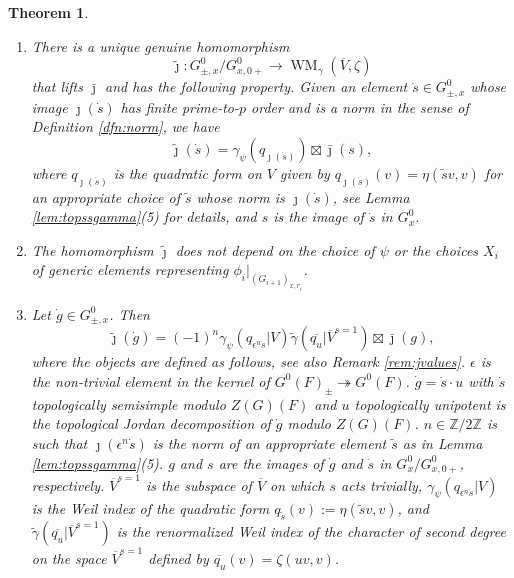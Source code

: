 \documentclass{article}
\def\ol#1{\overline{#1}}
\newcommand{\bZ}{\mathbb{Z}}
\newcommand{\eps}{\epsilon}
\newtheorem{thm}{Theorem}[subsection]
\theoremstyle{definition}
\numberwithin{equation}{subsection}
\renewcommand{\-}{\hyp{}}
\DeclareMathOperator{\WM}{WM}
\begin{document}
\begin{thm}\label{thm:main1b}
	 \leavevmode \begin{enumerate}
		\item \label{item:existenceoftildej} There is a unique genuine homomorphism
		\[ \tilde \jmath : G^0_{\pm, x}/G^0_{x,0+} \to \WM_\gamma(\ol{V}, \zeta) \]
		that lifts $\bar\jmath$ and has the following property. Given an element $\dot s \in G^0_{\pm,x}$ whose image $\jmath(\dot s)$ has finite prime-to-$p$ order and is a norm in the sense of Definition \ref{dfn:norm}, we have \[ \tilde\jmath(\dot s) = \gamma_\psi(q_{\jmath(\dot s)}) \boxtimes \bar\jmath(s), \]
		 where $q_{\jmath(\dot s)}$ is the quadratic form on $V$ given by $q_{\jmath(\dot s)}(v)=\eta(\tilde s v, v)$ for an appropriate choice of $\tilde s$ whose norm is $\jmath(\dot s)$, see Lemma \ref{lem:topssgamma}(5) for details, and $s$ is the image of $\dot s$ in $G_{x}^0$.
		
		\item\label{item:independenceofXi} The homomorphism $\tilde \jmath$ does not depend on the choice of $\psi$ or the choices $X_i$ of generic elements representing $\phi_i|_{(G_{i+1})_{x,r_i}}$.
		
		\item \label{item:description} Let $\dot g \in G^0_{\pm, x}$. Then 
			\begin{equation}
			\tilde\jmath(\dot g)=(-1)^n\gamma_\psi(q_{\epsilon^n\dot s}|V)\tilde\gamma(\overline{q_u}|\ol{V}^{s=1}) \boxtimes \bar\jmath(g),
		\end{equation}
		where the objects are defined as follows, see also Remark \ref{rem:jvalues}. $\epsilon$ is the non-trivial element in the kernel of $G^0(F)_{\pm} \twoheadrightarrow G^0(F)$. $\dot g = \dot s \cdot u$ with $\dot s$ topologically semisimple modulo $Z(G)(F)$ and $u$ topologically unipotent is the topological Jordan decomposition of $\dot g$ modulo $Z(G)(F)$. $n \in \bZ/2\bZ$ is such that $\jmath(\eps^n\dot s)$ is the norm of an appropriate element $\tilde s$ as in Lemma \ref{lem:topssgamma}(5). $g$ and $s$ are the images of $\dot g$ and $\dot s$ in $G^0_{x}/G^0_{x,0+}$, respectively. $\ol{V}^{s=1}$ is the subspace of $\ol{V}$ on which $s$ acts trivially, $\gamma_\psi(q_{\epsilon^n\dot s}|V)$ is the Weil index of the quadratic form $q_{\tilde s}(v):=\eta(\tilde s v, v)$, and $\tilde\gamma(\overline{q_u}|\ol{V}^{s=1})$ is the renormalized Weil index of the  character of second degree on the space $\ol{V}^{s=1}$ defined by $\ol{q_u}(v)=\zeta(uv,v)$.
		

\end{enumerate}
\end{thm}
\end{document}
